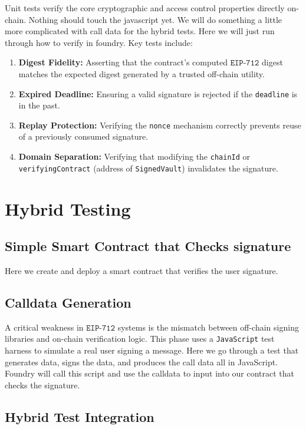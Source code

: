\documentclass{article}
\begin{document}
Unit tests verify the core cryptographic and access control properties directly on-chain. 
Nothing should touch the javascript yet.
We will do something a little more complicated with call data for the hybrid tests.
Here we will just run through how to verify in foundry.
Key tests include:
\begin{enumerate}
    \item \textbf{Digest Fidelity:} Asserting that the contract's computed $\texttt{EIP}$-$\texttt{712}$ digest matches the expected digest generated by a trusted off-chain utility.
    \item \textbf{Expired Deadline:} Ensuring a valid signature is rejected if the \texttt{deadline} is in the past.
    \item \textbf{Replay Protection:} Verifying the \texttt{nonce} mechanism correctly prevents reuse of a previously consumed signature.
    \item \textbf{Domain Separation:} Verifying that modifying the \texttt{chainId} or \texttt{verifyingContract} (address of \texttt{SignedVault}) invalidates the signature.
\end{enumerate}

\section{Hybrid Testing}
\label{sec:hybrid-phase}

\subsection{Simple Smart Contract that Checks signature}
Here we create and deploy a smart contract that verifies the user signature.

\subsection{Calldata Generation}
A critical weakness in $\texttt{EIP}$-$\texttt{712}$ systems is the mismatch between off-chain signing libraries and on-chain verification logic. 
This phase uses a \texttt{JavaScript} test harness to simulate a real user signing a message.
Here we go through a test that generates data, signs the data, and produces the call data all in JavaScript.
Foundry will call this script and use the calldata to input into our contract that checks the signature.

\subsection{Hybrid Test Integration}
\end{document}
